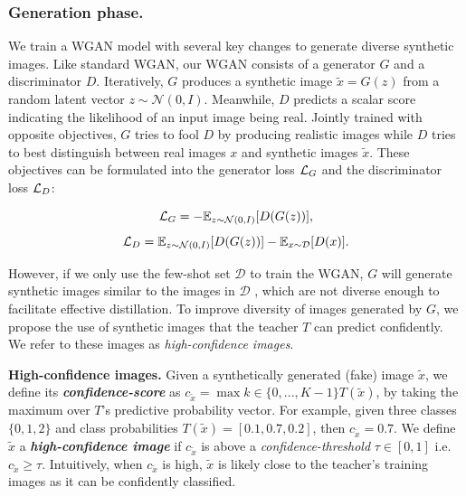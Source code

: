 \subsubsection{Generation phase.}
\begin{foldable}
    We train a WGAN model \cite{gulrajani2017improved} with several key changes to generate diverse synthetic images.
    Like standard WGAN, our WGAN consists of a generator $G$ and a discriminator $D$.
    Iteratively, $G$ produces a synthetic image \textbf{$\tilde{x}=G\left(z\right)$} from a random latent vector $\ensuremath{z\sim\mathcal{N}\left(0,I\right)}$.
    Meanwhile, $D$ predicts a scalar score indicating the likelihood of an input image being real.
    Jointly trained with opposite objectives, $G$ tries to fool $D$ by producing realistic images while $D$ tries to best distinguish between real images $x$ and synthetic images $\tilde{x}$.
    These objectives can be formulated into the generator loss ${\cal L}_{G}$ and the discriminator loss ${\cal L}_{D}$:
\end{foldable}
\begin{equation}
    \mathcal{L}_{G}=-\mathbb{E}_{z\sim{\cal N}(0,I)}[D(G(z))],\label{ch3:eq:Loss-G-WGAN}
\end{equation}
\begin{equation}
    \mathcal{L}_{D}=\mathbb{E}_{z\sim{\cal N}(0,I)}[D(G(z))]-\mathbb{E}_{x\sim{\cal D}}[D(x)].\label{ch3:eq:Loss-D-WGAN}
\end{equation}
\begin{foldable}
    However, if we only use the few-shot set $\mathcal{D}$ to train the WGAN, $G$ will generate synthetic images similar to the images in $\mathcal{D}$ \cite{karras2020training,yang2021data}, which are not diverse enough to facilitate effective distillation.
    To improve diversity of images generated by $G$, we propose the use of synthetic images that the teacher $T$ can predict confidently.
    We refer to these images as \textit{high-confidence images}.
\end{foldable}

\begin{foldable}
    \textbf{High-confidence images.} Given a synthetically generated (fake) image $\tilde{x}$, we define its \textbf{\textit{confidence-score}} as $c_{\tilde{x}}=\max{k\in\{0,...,K-1\}}T(\tilde{x})$, by taking the maximum over $T$'s predictive probability vector.
    For example, given three classes $\{0,1,2\}$ and class probabilities $T(\tilde{x})=[0.1,0.7,0.2]$, then $c_{\tilde{x}}=0.7$.
    We define $\tilde{x}$ a \textbf{\textit{high-confidence image}} if $c_{\tilde{x}}$ is above a \textit{confidence-threshold} $\tau\in[0,1]$ i.e. $c_{\tilde{x}}\geq\tau$.
    Intuitively, when $c_{\tilde{x}}$ is high, $\tilde{x}$ is likely close to the teacher's training images as it can be confidently classified.
\end{foldable}

